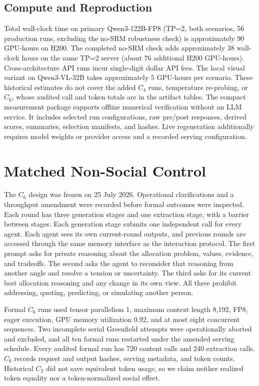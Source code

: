\subsection{Compute and Reproduction}\label{app:cost}
Total wall-clock time on primary Qwen3-122B-FP8 (TP=2, both scenarios, 56 production runs, excluding the no-SRM robustness check) is approximately 90 GPU-hours on H200. The completed no-SRM check adds approximately 38 wall-clock hours on the same TP=2 server (about 76 additional H200 GPU-hours). Cross-architecture API runs incur single-digit dollar API fees. The local visual variant on Qwen3-VL-32B takes approximately 5 GPU-hours per scenario. These historical estimates do not cover the added $C_4$ runs, temperature re-probing, or $C_6$, whose audited call and token totals are in the artifact tables. The compact measurement package supports offline numerical verification without an LLM service. It includes selected run configurations, raw pre/post responses, derived scores, summaries, selection manifests, and hashes. Live regeneration additionally requires model weights or provider access and a recorded serving configuration.

\section{Matched Non-Social Control}\label{app:c6}
The $C_6$ design was frozen on 25 July 2026. Operational clarifications and a throughput amendment were recorded before formal outcomes were inspected. Each round has three generation stages and one extraction stage, with a barrier between stages. Each generation stage submits one independent call for every agent. Each agent sees its own current-round outputs, and previous rounds are accessed through the same memory interface as the interaction protocol. The first prompt asks for private reasoning about the allocation problem, values, evidence, and tradeoffs. The second asks the agent to reconsider that reasoning from another angle and resolve a tension or uncertainty. The third asks for its current best allocation reasoning and any change in its own view. All three prohibit addressing, quoting, predicting, or simulating another person.

Formal $C_6$ runs used tensor parallelism 1, maximum context length 8,192, FP8, eager execution, GPU memory utilization 0.92, and at most eight concurrent sequences. Two incomplete serial Greenfield attempts were operationally aborted and excluded, and all ten formal runs restarted under the amended serving schedule. Every audited formal run has 720 content calls and 240 extraction calls. $C_6$ records request and output hashes, serving metadata, and token counts. Historical $C_2$ did not save equivalent token usage, so we claim neither realized token equality nor a token-normalized social effect.

